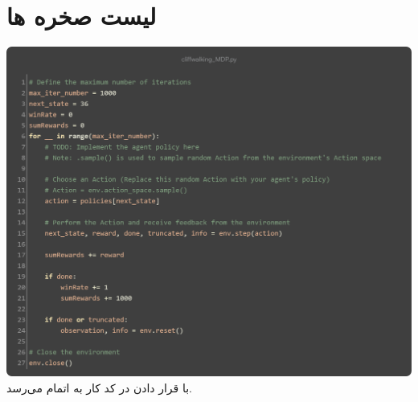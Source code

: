 \documentclass[12pt, dvipsnames, svgnames, x11names,]{article}
\begin{document}
	
		
	\section{لیست صخره ها}
	
	{\includegraphics[width=14cm]{images/07}}
	{\normalsize با قرار دادن  در کد کار به اتمام می‌رسد. } \par

	
\end{document}
